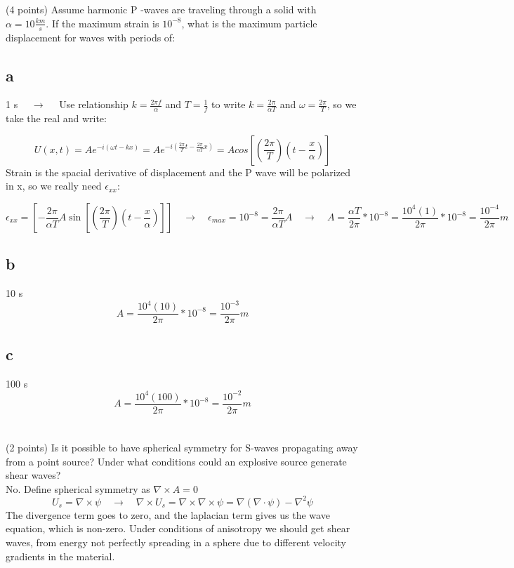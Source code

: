 \documentclass{article}
\begin{document}
\section{}
(4 points) Assume harmonic P -waves are traveling through a solid with $\alpha = 10 \frac{km}{s}$. If the maximum strain is $10^{-8}$, what is the maximum particle displacement for waves with periods of: 

\subsection*{a}
 1 s $\quad \rightarrow \quad$ Use relationship $k = \frac{2\pi f}{\alpha}$ and $T = \frac{1}{f}$ to write $k = \frac{2\pi}{\alpha T}$ and $\omega = \frac{2\pi}{T}$, so we take the real and write:

 \[
 U(x,t) = A e^{-i\left( \omega t-kx\right)} = A e^{-i\left(\frac{2\pi}{T}t - \frac{2\pi}{\alpha T}x  \right)} = A cos \left[\left(\frac{2\pi}{T}\right)\left(t - \frac{x}{\alpha }\right)\right]
 \]
Strain is the spacial derivative of displacement and the P wave will be polarized in x, so we really need $\epsilon_{xx}$:

\[
\epsilon_{xx} = \left[ - \frac{2\pi}{\alpha T} A \sin \left[\left(\frac{2\pi}{T}\right)\left(t - \frac{x}{\alpha }\right)\right] \right]\quad \rightarrow \quad \epsilon_{max} = 10^{-8} = \frac{2\pi}{\alpha T}A \quad \rightarrow \quad A = \frac{\alpha T}{2\pi} * 10^{-8} = \frac{10^4 \left(1\right)}{2\pi} * 10^{-8} = \frac{10^{-4}}{2\pi}m
\]
\subsection*{b}
 10 s
\[
A = \frac{10^4 \left(10\right)}{2\pi} * 10^{-8} = \frac{10^{-3}}{2\pi}m
\]
\subsection*{c}
 100 s
\[
A = \frac{10^4 \left(100\right)}{2\pi} * 10^{-8} = \frac{10^{-2}}{2\pi}m
\]
\section{}
(2 points) Is it possible to have spherical symmetry for S-waves propagating away from a point source? Under what conditions could an explosive source generate shear waves?\\

No. Define spherical symmetry as $\nabla \times A = 0$
\[
U_{s} = \nabla \times \psi \quad \rightarrow \quad \nabla \times U_{s} = \nabla \times \nabla \times \psi = \nabla \left( \nabla \cdot \psi \right) - \nabla^{2} \psi
\]
The divergence term goes to zero, and the laplacian term gives us the wave equation, which is non-zero. Under conditions of anisotropy we should get shear waves, from energy not perfectly spreading in a sphere due to different velocity gradients in the material.
\end{document}

